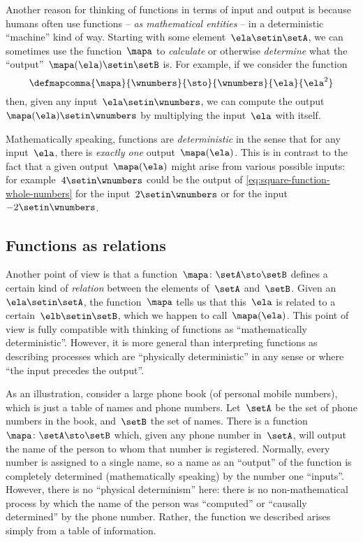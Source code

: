 Another reason for thinking of functions in terms of input and output is because humans often use functions -- \emph{as mathematical entities} -- in a deterministic ``machine'' kind of way.
Starting with some element~$\ela \setin\setA$, we can sometimes use the function~$\mapa$ to \emph{calculate} or otherwise \emph{determine} what the ``output''~$\mapa(\ela) \setin\setB$ is.
For example, if we consider the function
%
\begin{equation}
    \label{eq:square-function-whole-numbers}
    \defmapcomma{
        \mapa
    }{
        \wnumbers
    }{
        \sto
    }{
        \wnumbers
    }{
        \ela
    }{
        \ela^2
    }
\end{equation}
%
then, given any input~$\ela \setin\wnumbers$, we can compute the output~$\mapa(\ela) \setin\wnumbers$ by multiplying the input~$\ela$ with itself.

Mathematically speaking, functions are \emph{deterministic} in the sense that for any input~$\ela$, there is \emph{exactly one} output~$\mapa(\ela)$.
This is in contrast to the fact that a given output~$\mapa(\ela)$ might arise from various possible inputs: for example~$4 \setin\wnumbers$ could be the output of \cref{eq:square-function-whole-numbers} for the input~$2 \setin\wnumbers$ or for the input~$-2 \setin\wnumbers$.

\subsection{Functions as relations}

Another point of view is that a function~$\mapa\colon \setA \sto \setB$ defines a certain kind of \emph{relation} between the elements of~$\setA$ and~$\setB$.
Given an~$\ela \setin\setA$, the function~$\mapa$ tells us that this~$\ela$ is related to a certain~$\elb \setin \setB$, which we happen to call~$\mapa(\ela)$.
This point of view is fully compatible with thinking of functions as ``mathematically deterministic''.
However, it is more general than interpreting functions as describing processes which are ``physically deterministic'' in any sense or where ``the input precedes the output''.

As an illustration, consider a large phone book (of personal mobile numbers), which is just a table of names and phone numbers.
Let~$\setA$ be the set of phone numbers in the book, and~$\setB$ the set of names.
There is a function~$\mapa\colon \setA \sto \setB$ which, given any phone number in~$\setA$, will output the name of the person to whom that number is registered.
Normally, every number is assigned to a single name, so a name as an ``output'' of the function is completely determined (mathematically speaking) by the number one ``inputs''.
However, there is no ``physical determinism'' here: there is no non-mathematical process by which the name of the person was ``computed'' or ``causally determined'' by the phone number.
Rather, the function we described arises simply from a table of information.

